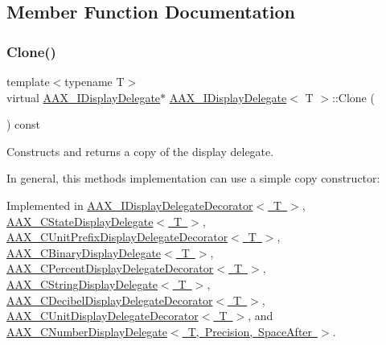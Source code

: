 \subsection{Member Function Documentation}
\mbox{\label{a01801_a138a82c124ddda8255ce39194dfc1f3f}} 
\subsubsection{\texorpdfstring{Clone()}{Clone()}}
{\footnotesize\ttfamily template$<$typename T$>$ \\
virtual \mbox{\hyperlink{a01801}{A\+A\+X\+\_\+\+I\+Display\+Delegate}}$\ast$ \mbox{\hyperlink{a01801}{A\+A\+X\+\_\+\+I\+Display\+Delegate}}$<$ T $>$\+::Clone (\begin{DoxyParamCaption}{ }\end{DoxyParamCaption}) const\hspace{0.3cm}{\ttfamily [pure virtual]}}



Constructs and returns a copy of the display delegate. 

In general, this method\textquotesingle{}s implementation can use a simple copy constructor\+:


\begin{DoxyCode}{0}
\DoxyCodeLine{\textcolor{keyword}{}\{}
\DoxyCodeLine{\}}
\end{DoxyCode}
 

Implemented in \mbox{\hyperlink{a01805_a8e2ad7312467089a9112ba6460fe0e5b}{A\+A\+X\+\_\+\+I\+Display\+Delegate\+Decorator$<$ T $>$}}, \mbox{\hyperlink{a01561_ad6e328d8784aaccc960da70f51f040a3}{A\+A\+X\+\_\+\+C\+State\+Display\+Delegate$<$ T $>$}}, \mbox{\hyperlink{a01589_aa09598c77cd1e9556013bc8cdd651a2b}{A\+A\+X\+\_\+\+C\+Unit\+Prefix\+Display\+Delegate\+Decorator$<$ T $>$}}, \mbox{\hyperlink{a01449_ac0f060429501b13e2f79babbcfdda9ab}{A\+A\+X\+\_\+\+C\+Binary\+Display\+Delegate$<$ T $>$}}, \mbox{\hyperlink{a01549_affe52efa34c969895f75b067e875dafb}{A\+A\+X\+\_\+\+C\+Percent\+Display\+Delegate\+Decorator$<$ T $>$}}, \mbox{\hyperlink{a01581_a011fc2e134ffa0469ee995232922bcb2}{A\+A\+X\+\_\+\+C\+String\+Display\+Delegate$<$ T $>$}}, \mbox{\hyperlink{a01469_a2abd5f4d5a8d6db7db73fadfe8a2aa04}{A\+A\+X\+\_\+\+C\+Decibel\+Display\+Delegate\+Decorator$<$ T $>$}}, \mbox{\hyperlink{a01585_ad987fdc5423673b664ce099c6f27bf06}{A\+A\+X\+\_\+\+C\+Unit\+Display\+Delegate\+Decorator$<$ T $>$}}, and \mbox{\hyperlink{a01509_ab92a0973a7ed56034aa269c760d6b935}{A\+A\+X\+\_\+\+C\+Number\+Display\+Delegate$<$ T, Precision, Space\+After $>$}}.



